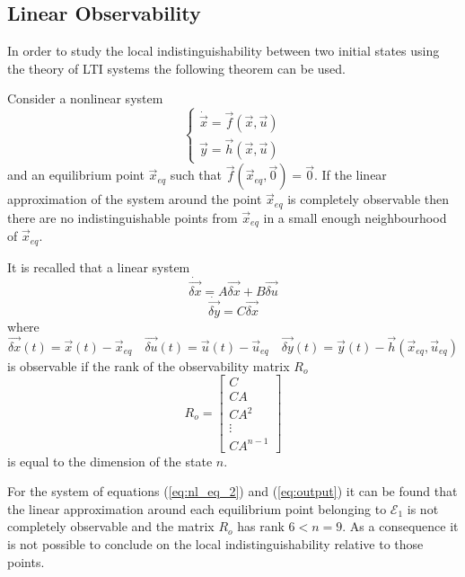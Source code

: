 \subsection{Linear Observability}
In order to study the local indistinguishability between two initial states using the theory of LTI systems
the following theorem can be used.
\begin{theorem}
  Consider a nonlinear system 
  \[
  \begin{cases}
    \dot{\vec{x}} = \vec{f}(\vec{x}, \vec{u})\\
    \vec{y} = \vec{h}(\vec{x}, \vec{u})
  \end{cases}
  \]
  and an equilibrium point $\vec{x}_{eq}$ such that $\vec{f}(\vec{x}_{eq}, \vec{0}) = \vec{0}$.
  If the linear approximation of the system around the point $\vec{x}_{eq}$ is completely
  observable then there are no indistinguishable points from $\vec{x}_{eq}$ in a small enough
  neighbourhood of $\vec{x}_{eq}$.
\end{theorem}
It is recalled that a linear system
\[
\dot{\vec{\delta x}} = A \vec{\delta x} + B \vec{\delta u}
\]
\[
\dot{\vec{\delta y}} = C \vec{\delta x}
\]
where
\[
\vec{\delta x}(t) = \vec{x}(t) - \vec{x}_{eq} \quad \vec{\delta u}(t) = \vec{u}(t) - \vec{u}_{eq} \quad
\vec{\delta y}(t) = \vec{y}(t) - \vec{h}(\vec{x}_{eq}, \vec{u}_{eq})
\]
is observable if the rank of the observability matrix $R_o$ 
\begin{equation} \label{eq:linear_observability}
R_o = 
\begin{bmatrix}
C \\ CA \\ CA^2 \\ \vdots \\ CA^{n-1}
\end{bmatrix}
\end{equation}
is equal to the dimension of the state $n$.
\par
For the system of equations (\ref{eq:nl_eq_2}) and (\ref{eq:output}) it can be found that the linear approximation
around each equilibrium point belonging to $\mathcal{E}_{1}$ is not completely observable and
the matrix $R_o$ has rank $6 < n = 9$. As a consequence it is not possible to conclude on
the local indistinguishability relative to those points.

